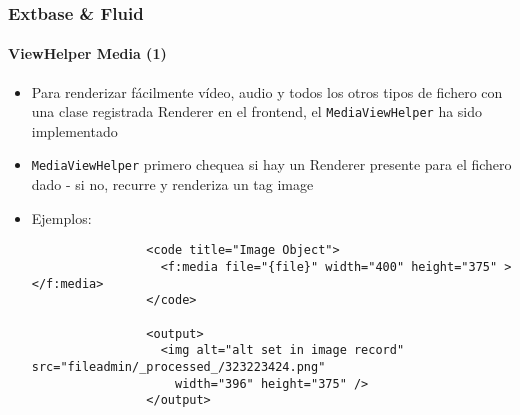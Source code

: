 \begin{frame}[fragile]
	\frametitle{Extbase \& Fluid}
	\framesubtitle{ViewHelper Media (1)}

	\lstset{basicstyle=\tiny\ttfamily}

	\begin{itemize}

		\item Para renderizar fácilmente vídeo, audio y todos los otros tipos de fichero con
			una clase registrada Renderer en el frontend, el \texttt{MediaViewHelper}
			ha sido implementado

		\item \texttt{MediaViewHelper} primero chequea si hay un Renderer presente para
			el fichero dado - si no, recurre y renderiza un tag image

		\item Ejemplos:

			\begin{lstlisting}
				<code title="Image Object">
				  <f:media file="{file}" width="400" height="375" ></f:media>
				</code>

				<output>
				  <img alt="alt set in image record" src="fileadmin/_processed_/323223424.png"
				    width="396" height="375" />
				</output>
			\end{lstlisting}

	\end{itemize}

\end{frame}


